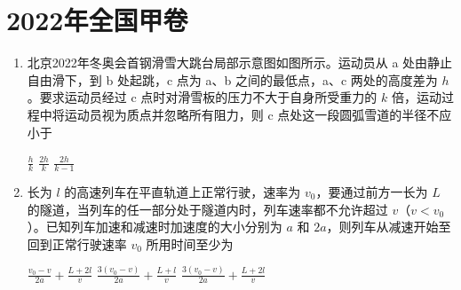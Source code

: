 \documentclass[\gkver]{gaokaozhenti}
\begin{document}
\chapter{2022年全国甲卷}

\begin{enumerate}
\item
北京2022年冬奥会首钢滑雪大跳台局部示意图如图所示。运动员从 a 处由静止自由滑下，到 b 处起跳，c 点为 a、b 之间的最低点，a、c 两处的高度差为 $h$。要求运动员经过 c 点时对滑雪板的压力不大于自身所受重力的 $k$ 倍，运动过程中将运动员视为质点并忽略所有阻力，则 c 点处这一段圆弧雪道的半径不应小于


{$\frac{h}{k}$}
{$\frac{2h}{k}$}
{$\frac{2h}{k-1}$}


\item
长为 $l$ 的高速列车在平直轨道上正常行驶，速率为 $v_{0}$，要通过前方一长为 $L$ 的隧道，当列车的任一部分处于隧道内时，列车速率都不允许超过 $v$（$v<v_{0}$）。已知列车加速和减速时加速度的大小分别为 $a$ 和 $2a$，则列车从减速开始至回到正常行驶速率 $v_{0}$ 所用时间至少为

{$\frac{v_{0}-v}{2a}+\frac{L+2l}{v}$}
{$\frac{3(v_{0}-v)}{2a}+\frac{L+l}{v}$}
{$\frac{3(v_{0}-v)}{2a}+\frac{L+2l}{v}$}

\end{enumerate}
\end{document}
